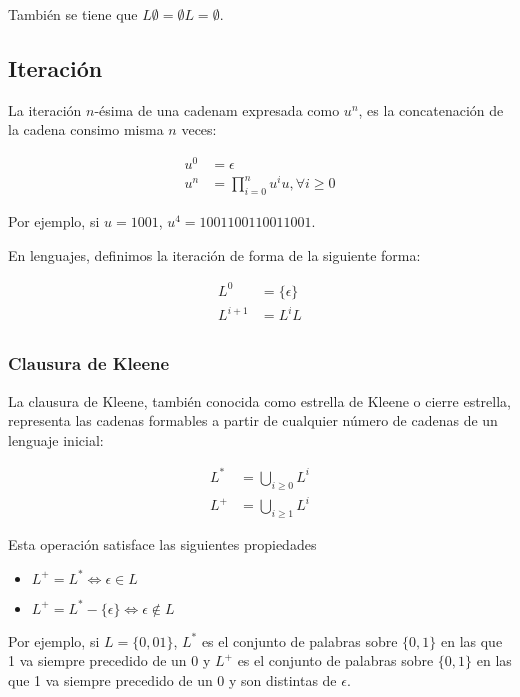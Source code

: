 También se tiene que $L\emptyset = \emptyset L = \emptyset$.

\subsection{Iteración}

La iteración $n$-ésima de una cadenam expresada como $u^n$, es la concatenación de la cadena consimo misma $n$ veces:

\begin{align*}
	u^0 &= \epsilon \\
	u^n &= \prod_{i=0}^{n} u^i u, \forall i \geq 0
\end{align*}

Por ejemplo, si $u=1001$, $u^4=1001100110011001$.

En lenguajes, definimos la iteración de forma de la siguiente forma:

\begin{align*}
	L^0     &= \{\epsilon\} \\
	L^{i+1} &= L^i L \\
\end{align*}

\subsubsection{Clausura de Kleene}

La clausura de Kleene, también conocida como estrella de Kleene o cierre estrella, representa las cadenas formables a partir de cualquier número de cadenas de un lenguaje inicial:

\begin{align*}
	L^* &= \bigcup_{i \geq 0} L^i \\
	L^+ &= \bigcup_{i \geq 1} L^i
\end{align*}

Esta operación satisface las siguientes propiedades

\begin{itemize}
	\item $L^+ = L^* \Leftrightarrow \epsilon \in L$
	\item $L^+ = L^* - \{\epsilon\} \Leftrightarrow \epsilon \notin L$
\end{itemize}

Por ejemplo, si $L = \{0, 01\}$, $L^*$ es el conjunto de palabras sobre $\{0,1\}$ en las que 1 va siempre precedido de un 0 y $L^+$ es el conjunto de palabras sobre $\{0,1\}$ en las que 1 va siempre precedido de un 0 y son distintas de $\epsilon$.

